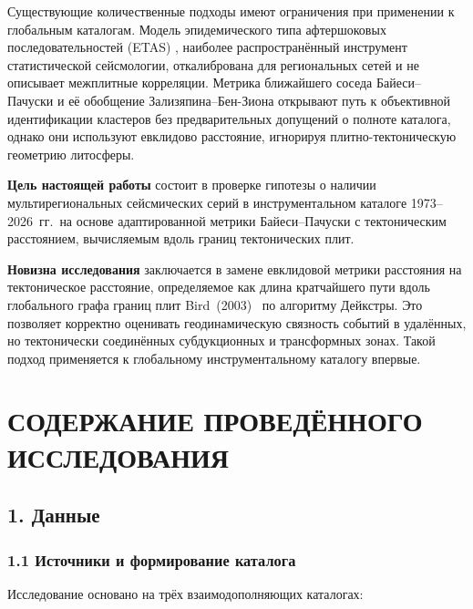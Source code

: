 \documentclass[12pt,a4paper]{article}
\begin{document}
Существующие количественные подходы имеют ограничения при применении к
глобальным каталогам. Модель эпидемического типа афтершоковых последовательностей
(ETAS) \cite{Ogata1988}, наиболее распространённый инструмент статистической
сейсмологии, откалибрована для региональных сетей и не описывает межплитные
корреляции. Метрика ближайшего соседа Байеси--Пачуски \cite{Baiesi2004}
и её обобщение Зализяпина--Бен-Зиона \cite{ZaliapinBenZion2008,ZaliapinBenZion2013}
открывают путь к объективной идентификации кластеров без предварительных
допущений о полноте каталога, однако они используют евклидово расстояние,
игнорируя плитно-тектоническую геометрию литосферы.

\textbf{Цель настоящей работы} состоит в проверке гипотезы о наличии
мультирегиональных сейсмических серий в инструментальном каталоге
1973--2026~гг.\ на основе адаптированной метрики Байеси--Пачуски с тектоническим
расстоянием, вычисляемым вдоль границ тектонических плит.

\textbf{Новизна исследования} заключается в замене евклидовой метрики
расстояния на тектоническое расстояние, определяемое как длина кратчайшего
пути вдоль глобального графа границ плит Bird~(2003)~\cite{Bird2003} по алгоритму
Дейкстры. Это позволяет корректно оценивать геодинамическую связность событий
в удалённых, но тектонически соединённых субдукционных и трансформных зонах.
Такой подход применяется к глобальному инструментальному каталогу впервые.

\vspace{0.4cm}

\section*{СОДЕРЖАНИЕ ПРОВЕДЁННОГО ИССЛЕДОВАНИЯ}

\subsection*{1. Данные}

\subsubsection*{1.1 Источники и формирование каталога}

Исследование основано на трёх взаимодополняющих каталогах:
\end{document}
